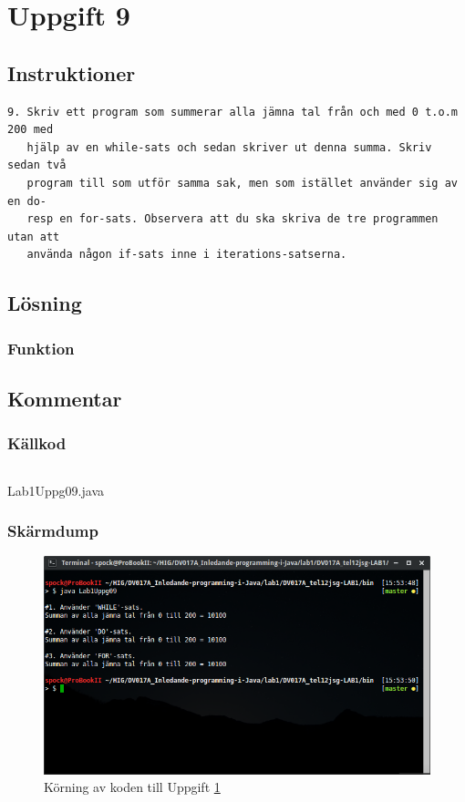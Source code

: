 \section{Uppgift 9}\label{uppgift-9}

\subsection{Instruktioner}
\begin{verbatim}
9. Skriv ett program som summerar alla jämna tal från och med 0 t.o.m 200 med
   hjälp av en while-sats och sedan skriver ut denna summa. Skriv sedan två
   program till som utför samma sak, men som istället använder sig av en do-
   resp en for-sats. Observera att du ska skriva de tre programmen utan att
   använda någon if-sats inne i iterations-satserna.
\end{verbatim}

\subsection{Lösning}
\subsubsection{Funktion}
\subsection{Kommentar}

\subsubsection{Källkod}\label{uppgift-9_src}
    \inputminted[linenos]{java}{src/Lab1Uppg09.java}
    \caption{Lab1Uppg09.java}
    \label{Uppg9src}

\subsubsection{Skärmdump}
\begin{figure}[htbp]
    \centering
        \includegraphics[width=\linewidth]{img/09.png}
    \caption{Körning av koden till Uppgift \ref{uppgift-9}}
    \label{fig:screenshot-09}
\end{figure}
